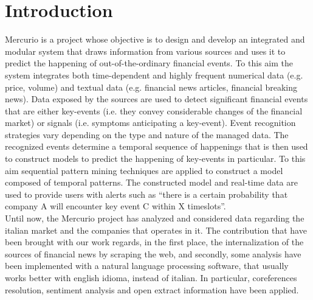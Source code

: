 \section{Introduction}
Mercurio is a project whose objective is to design and develop an integrated and modular system that draws information from various sources and uses it to predict the happening of out-of-the-ordinary financial events. To this aim the system integrates both time-dependent and highly frequent numerical data (e.g. price, volume) and textual data (e.g. financial news articles, financial breaking news).
Data exposed by the sources are used to detect significant financial events that are either key-events (i.e. they convey considerable changes of the financial market) or signals (i.e. symptoms anticipating a key-event). Event recognition strategies vary depending on the type and nature of the managed data. The recognized events determine a temporal sequence of happenings that is then used to construct models to predict the happening of key-events in particular. To this aim sequential pattern mining techniques are applied to construct a model composed of temporal patterns. The constructed model and real-time data are used to provide users with alerts such as “there is a certain probability that company A will encounter key event C within X timeslots”. \\
Until now, the Mercurio project has analyzed and considered data regarding the italian market and the companies that operates in it. The contribution that have been brought with our work regards, in the first place, the internalization of the sources of financial news by scraping the web, and secondly, some analysis have been implemented with a natural language processing software, that usually works better with english idioma, instead of italian. In particular, coreferences resolution, sentiment analysis and open extract information have been applied. \\